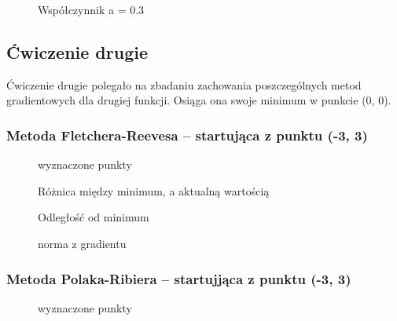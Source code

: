 \documentclass[a4paper, 10pt]{article}
\begin{document}
		
		    \begin{figure}[H]
		        \centering
		        \def \svgwidth{0.75\columnwidth}
		        
		        \caption{Współczynnik a = 0.3}
		    \end{figure}\noindent

		\subsection{Ćwiczenie drugie}
			Ćwiczenie drugie polegało na zbadaniu zachowania poszczególnych metod gradientowych dla drugiej funkcji. Osiąga ona swoje minimum w punkcie (0, 0).
		   	
			\subsubsection{Metoda Fletchera-Reevesa -- startująca z punktu (-3, 3)}
			    \begin{figure}[H]
			        \centering
			        \def \svgwidth{0.75\columnwidth}
			        
			        \caption{wyznaczone punkty}
			    \end{figure}\noindent
			
			    \begin{figure}[H]
			        \centering
			        \def \svgwidth{0.75\columnwidth}
			        
			        \caption{Różnica między minimum, a aktualną wartością}
			    \end{figure}\noindent
			
			    \begin{figure}[H]
			        \centering
			        \def \svgwidth{0.75\columnwidth}
			        
			        \caption{Odległość od minimum}
			    \end{figure}\noindent
			    
    			\begin{figure}[H]
    				\centering
    				\def \svgwidth{0.75\columnwidth}
    				
    				\caption{norma z gradientu}
    			\end{figure}\noindent
		
			\subsubsection{Metoda Polaka-Ribiera -- startujjąca z punktu (-3, 3)}
			    \begin{figure}[H]
			        \centering
			        \def \svgwidth{0.75\columnwidth}
			        
			        \caption{wyznaczone punkty}
			    \end{figure}\noindent
			
\end{document}
